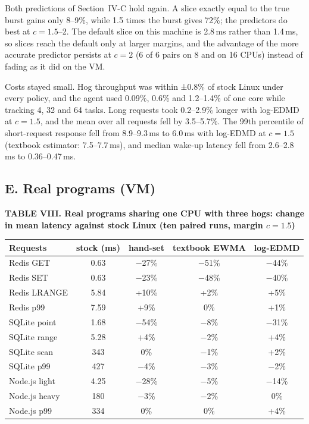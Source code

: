 \documentclass{article}
\begin{document}
Both predictions of Section~IV-C hold again. A slice exactly equal to the true burst gains only 8--9\%, while 1.5 times the burst gives 72\%; the predictors do best at $c=1.5$--2. The default slice on this machine is 2.8\,ms rather than 1.4\,ms, so slices reach the default only at larger margins, and the advantage of the more accurate predictor persists at $c=2$ (6 of 6 pairs on 8 and on 16 CPUs) instead of fading as it did on the VM.

Costs stayed small. Hog throughput was within ±0.8\% of stock Linux under every policy, and the agent used 0.09\%, 0.6\% and 1.2--1.4\% of one core while tracking 4, 32 and 64 tasks. Long requests took 0.2--2.9\% longer with log-EDMD at $c=1.5$, and the mean over all requests fell by 3.5--5.7\%. The 99th percentile of short-request response fell from 8.9--9.3\,ms to 6.0\,ms with log-EDMD at $c=1.5$ (textbook estimator: 7.5--7.7\,ms), and median wake-up latency fell from 2.6--2.8\,ms to 0.36--0.47\,ms.

\subsection*{E. Real programs (VM)}


\textbf{TABLE VIII. Real programs sharing one CPU with three hogs: change in mean latency against stock Linux (ten paired runs, margin $c=1.5$)}




\begin{tabular}{lcccc}
\toprule
Requests & stock (ms) & hand-set & textbook EWMA & log-EDMD \\
\midrule
Redis GET & 0.63 & −27\% & −51\% & −44\% \\
Redis SET & 0.63 & −23\% & −48\% & −40\% \\
Redis LRANGE & 5.84 & +10\% & +2\% & +5\% \\
Redis p99 & 7.59 & +9\% & 0\% & +1\% \\
SQLite point & 1.68 & −54\% & −8\% & −31\% \\
SQLite range & 5.28 & +4\% & −2\% & +4\% \\
SQLite scan & 343 & 0\% & −1\% & +2\% \\
SQLite p99 & 427 & −4\% & −3\% & −2\% \\
Node.js light & 4.25 & −28\% & −5\% & −14\% \\
Node.js heavy & 180 & −3\% & −2\% & 0\% \\
Node.js p99 & 334 & 0\% & 0\% & +4\% \\
\bottomrule
\end{tabular}
\end{document}
